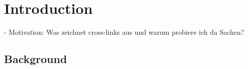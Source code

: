 
\chapter{Introduction}
\label{introduction}
- Motivation: Was zeichnet cross-links aus und warum probiere ich da Sachen?

%
%

\section{Background}
\label{background}

